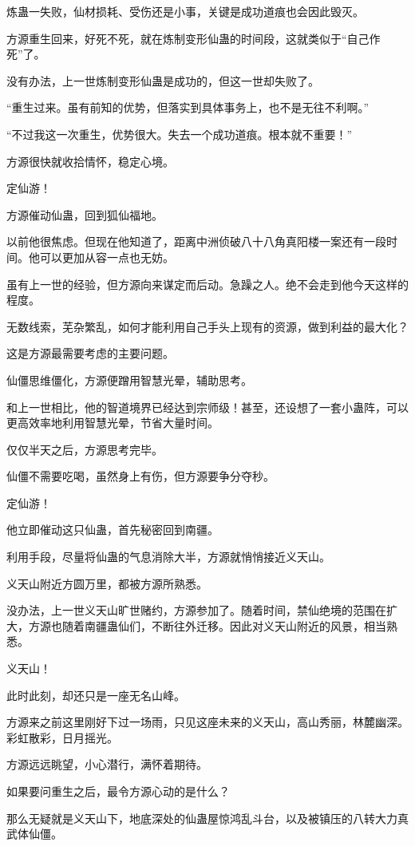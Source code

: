 \begin{this_body}
炼蛊一失败，仙材损耗、受伤还是小事，关键是成功道痕也会因此毁灭。

方源重生回来，好死不死，就在炼制变形仙蛊的时间段，这就类似于“自己作死”了。

没有办法，上一世炼制变形仙蛊是成功的，但这一世却失败了。

“重生过来。虽有前知的优势，但落实到具体事务上，也不是无往不利啊。”

“不过我这一次重生，优势很大。失去一个成功道痕。根本就不重要！”

方源很快就收拾情怀，稳定心境。

定仙游！

方源催动仙蛊，回到狐仙福地。

以前他很焦虑。但现在他知道了，距离中洲侦破八十八角真阳楼一案还有一段时间。他可以更加从容一点也无妨。

虽有上一世的经验，但方源向来谋定而后动。急躁之人。绝不会走到他今天这样的程度。

无数线索，芜杂繁乱，如何才能利用自己手头上现有的资源，做到利益的最大化？

这是方源最需要考虑的主要问题。

仙僵思维僵化，方源便蹭用智慧光晕，辅助思考。

和上一世相比，他的智道境界已经达到宗师级！甚至，还设想了一套小蛊阵，可以更高效率地利用智慧光晕，节省大量时间。

仅仅半天之后，方源思考完毕。

仙僵不需要吃喝，虽然身上有伤，但方源要争分夺秒。

定仙游！

他立即催动这只仙蛊，首先秘密回到南疆。

利用手段，尽量将仙蛊的气息消除大半，方源就悄悄接近义天山。

义天山附近方圆万里，都被方源所熟悉。

没办法，上一世义天山旷世赌约，方源参加了。随着时间，禁仙绝境的范围在扩大，方源也随着南疆蛊仙们，不断往外迁移。因此对义天山附近的风景，相当熟悉。

义天山！

此时此刻，却还只是一座无名山峰。

方源来之前这里刚好下过一场雨，只见这座未来的义天山，高山秀丽，林麓幽深。彩虹散彩，日月摇光。

方源远远眺望，小心潜行，满怀着期待。

如果要问重生之后，最令方源心动的是什么？

那么无疑就是义天山下，地底深处的仙蛊屋惊鸿乱斗台，以及被镇压的八转大力真武体仙僵。


\end{this_body}
